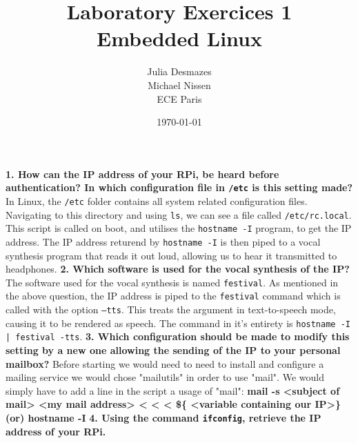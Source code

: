 \documentclass[a4paper,oneside,onecolumn]{article}
\newcommand{\code}[1]{\colorbox{codegray}{\texttt{#1}}}
\begin{document}
\title{Laboratory Exercices 1 \\ Embedded Linux}
\author{Julia Desmazes \\ Michael Nissen \\ ECE Paris}
\date{\today}
\maketitle
\bigskip

\noindent
\textbf{1. How can the IP address of your RPi, be heard before authentication? In which configuration file in \texttt{/etc} is this setting made?}
\newline
\newline
In Linux, the \texttt{/etc} folder contains all system related configuration files. Navigating to this directory and using \code{ls}, we can see a file called \texttt{/etc/rc.local}. This script is called on boot, and utilises the \code{hostname -I} program, to get the IP address. The IP address returend by \code{hostname -I} is then piped to a vocal synthesis program that reads it out loud, allowing us to hear it transmitted to headphones.
\newline
\newline
\noindent
\textbf{2. Which software is used for the vocal synthesis of the IP?}
\newline
\newline
The software used for the vocal synthesis is named \texttt{festival}. As mentioned in the above question, the IP address is piped to the \texttt{festival} command which is called with the option \code{--tts}. This treats the argument in text-to-speech mode, causing it to be rendered as speech. The command in it's entirety is \code{hostname -I | festival -tts}.
\newline
\newline
\noindent
\textbf{3. Which configuration should be made to modify this setting by a new one allowing the sending of the IP to your personal mailbox?}
\newline
\newline
Before starting we would need to need to install and configure a mailing service we would chose "mailutils" in order to use "mail". We would simply have to add a line in the script a usage of "mail":
\textbf{mail -s <subject of mail> <my mail address> < < < \$\{ <variable containing our IP>\} (or) hostname -I }
\newline
\newline
\noindent
\textbf{4. Using the command \code{ifconfig}, retrieve the IP address of your RPi.}
\end{document}
